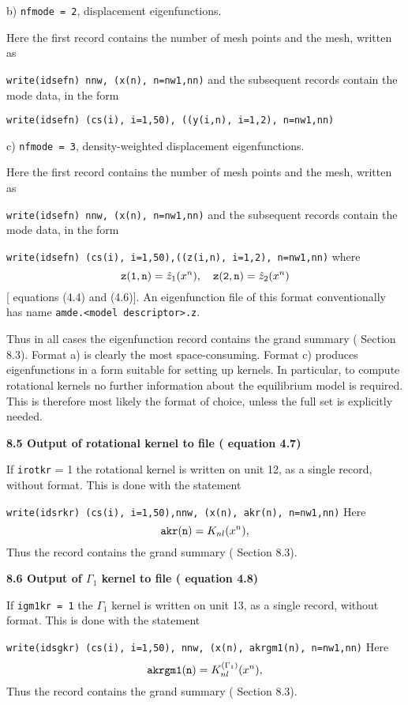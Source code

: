 \subsect
b) {\tt nfmode = 2}, displacement eigenfunctions.

Here the first record contains the number of mesh points and the 
mesh, written as

      {\tt write(idsefn) nnw, (x(n), n=nw1,nn)}
\smallskip\noindent
and the subsequent records contain the mode data, in the form

      {\tt write(idsefn) (cs(i), i=1,50), ((y(i,n), i=1,2), n=nw1,nn)}

\subsect
c) {\tt nfmode = 3}, density-weighted displacement eigenfunctions.

Here the first record contains the number of mesh points and the 
mesh, written as

      {\tt write(idsefn) nnw, (x(n), n=nw1,nn)}
\smallskip\noindent
and the subsequent records contain the mode data, in the form

      {\tt write(idsefn) (cs(i), i=1,50),((z(i,n), i=1,2), n=nw1,nn)}
\smallskip\noindent
where
$$
{\tt z(1,n)} = \hat z_1 (x^n ) , \quad
{\tt z(2,n)} = \hat z_2 (x^n ) 
$$
[{\cf} equations (4.4) and (4.6)].
An eigenfunction file of this format conventionally has
name {\tt amde.<model descriptor>.z}.
\medskip

Thus in all cases the eigenfunction record contains 
the grand summary ({\cf} Section 8.3).
Format a) is clearly the most space-consuming.
Format c) produces eigenfunctions in a form suitable for
setting up kernels.
In particular, to compute rotational kernels no further information
about the equilibrium model is required.
This is therefore most likely the format of choice, unless
the full set is explicitly needed.

\subsect
{\bf 8.5 Output of rotational kernel to file ({\cf} equation 4.7)}

If {\tt irotkr} = 1 
the rotational kernel is written on unit 12, as a single
record, without format. This is done with the statement 

      {\tt write(idsrkr) (cs(i), i=1,50),nnw, (x(n), akr(n), n=nw1,nn)}
\medskip\noindent
Here 
$$
{\tt akr(n)} = K_{nl} (x^n ) , 
$$
Thus the record contains the grand summary ({\cf} Section 8.3).

\subsect
{\bf 8.6 Output of $\Gamma_1$ kernel to file ({\cf} equation 4.8)}

If {\tt igm1kr = 1} 
the $\Gamma_1$ kernel is written on unit 13, as a single
record, without format. This is done with the statement 

      {\tt write(idsgkr) (cs(i), i=1,50), nnw, (x(n), akrgm1(n), n=nw1,nn)}
\medskip\noindent
Here 
$$
{\tt akrgm1(n)} = K_{nl}^{(\Gamma_1 )} (x^n ) , 
$$
Thus the record contains the grand summary ({\cf} Section 8.3).

